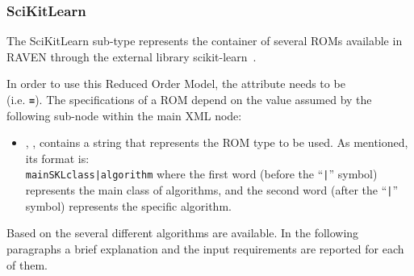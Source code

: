 \subsubsection{SciKitLearn}
\label{subsubsec:SciKitLearn}
The SciKitLearn sub-type represents the container of several ROMs available in
RAVEN through the external library scikit-learn~\cite{SciKitLearn}.
%

In order to use this Reduced Order Model, the  attribute
 needs to be \\  (i.e.
\textbf{\texttt{=}}).
%
The specifications of a  ROM depend on the value assumed
by the following sub-node within the main  XML node:
\begin{itemize}
  \item {}, , contains a string that represents the ROM type to be used.
  As mentioned, its format is:\\
  \texttt{mainSKLclass|algorithm} where the
  first word (before the ``\texttt{|}'' symbol) represents the main class of
  algorithms, and the second word (after the ``\texttt{|}'' symbol) represents
  the specific algorithm.
\end{itemize}
Based on the  several different algorithms are available.
%
In the following paragraphs a brief explanation and the input requirements are
reported for each of them.
%
